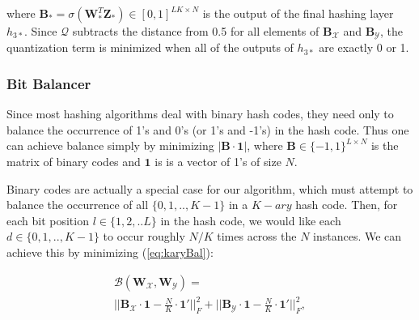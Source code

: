 \documentclass[letterpaper]{article}
\DeclareMathOperator{\trace}{tr}
\DeclareMathOperator{\abs}{abs}
\newcommand{\bpx}{\mathbf{B_\mathcal{X}}}
\newcommand{\bpy}{\mathbf{B_\mathcal{Y}}}
\newcommand{\bps}{\mathbf{B_*}}
\newcommand{\WX}{\mathbf{W}_\mathcal{X}}
\newcommand{\WY}{\mathbf{W}_\mathcal{Y}}
\newcommand{\WS}{\mathbf{W}_*}
\begin{document}
\begin{comment}
\\
\Big|\Big| \big| \bpx - 0.5 \cdot\mathbf{E}\big| - 0.5 \cdot \mathbf{E} \Big|\Big|_1 + \\
\Big|\Big| \big| \bpy' - 0.5 \cdot\mathbf{E}\big| - 0.5 \cdot \mathbf{E} \Big|\Big|_1 \\
\Big|\Big| \abs\big( \bpx' - 0.5 \cdot\mathbf{E}\big) - 0.5 \cdot \mathbf{E} \Big|\Big|_1 + \\
\Big|\Big| \abs\big( \bpy' - 0.5 \cdot\mathbf{E}\big) - 0.5 \cdot \mathbf{E} \Big|\Big|_1 + \\
\trace\Big(\mathbf{E} \cdot \Big[ \big| \bpx - 0.5 \cdot\mathbf{E}\big| - 0.5 \cdot \mathbf{E} \Big] \Big) + \\
\trace\Big(\mathbf{E} \cdot \Big[ \big| \bpy - 0.5 \cdot\mathbf{E}\big| - 0.5 \cdot \mathbf{E} \Big] \Big), \\
\big|\big| \bpx \circ \big(\mathbf{E} - \bpx \big) \big|\big|_F^2 + \big|\big| \bpy \circ \big(\mathbf{E} - \bpy \big) \big|\big|_F^2
\end{comment}

\noindent where $ \bps = \sigma(\WS^T\mathbf{Z_*}) \in [0,1]^{LK \times N} $ is the output of the final hashing layer $ h_{3*} $. Since $ \mathcal{Q} $ subtracts the distance from 0.5 for all elements of $ \bpx $ and $ \bpy $, the quantization term is minimized when all of the outputs of $ h_{3*} $ are exactly 0 or 1.

\subsubsection{Bit Balancer}

Since most hashing algorithms deal with binary hash codes, they need only to balance the occurrence of 1's and 0's (or 1's and -1's) in the hash code. Thus one can achieve balance simply by minimizing $ \big| \mathbf{B} \cdot \mathbf{1} \big| $, where $ \mathbf{B} \in \{-1,1\}^{L \times N} $ is the matrix of binary codes and $ \mathbf{1} $ is is a vector of 1's of size $ N $.

Binary codes are actually a special case for our algorithm, which must attempt to balance the occurrence of all $ \{0,1,.., K-1\} $ in a $K-ary$ hash code. Then, for each bit position $ l \in \{1,2,..L\} $ in the hash code, we would like each $ d \in \{0,1,.., K-1\} $ to occur roughly $ N / K $ times across the $ N $ instances. We can achieve this by minimizing (\ref{eq:karyBal}): 

\begin{equation}
\label{eq:karyBal}
\begin{gathered}
\mathcal{B}(\WX, \WY) = \\
\Big|\Big| \bpx \cdot \mathbf{1} - \frac{N}{K} \cdot \mathbf{1'} \Big|\Big|_F^2 + \Big|\Big| \bpy \cdot \mathbf{1} - \frac{N}{K} \cdot \mathbf{1'} \Big|\Big|_F^2,
\end{gathered}
\end{equation}
\end{document}
